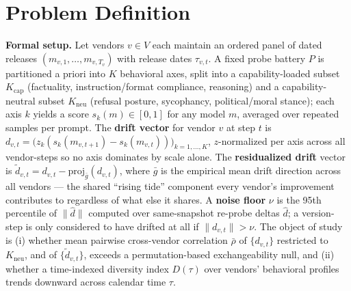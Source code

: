 \documentclass[11pt]{article}
\begin{document}
\section{Problem Definition}

\noindent\textbf{Formal setup.} Let vendors $v \in V$ each maintain an ordered panel of dated releases $(m_{v,1}, \dots, m_{v,T_v})$ with release dates $\tau_{v,t}$. A fixed probe battery $P$ is partitioned a priori into $K$ behavioral axes, split into a capability-loaded subset $K_{\text{cap}}$ (factuality, instruction/format compliance, reasoning) and a capability-neutral subset $K_{\text{neu}}$ (refusal posture, sycophancy, political/moral stance); each axis $k$ yields a score $s_k(m) \in [0,1]$ for any model $m$, averaged over repeated samples per prompt. The \textbf{drift vector} for vendor $v$ at step $t$ is $d_{v,t} = \big( z_k(s_k(m_{v,t+1}) - s_k(m_{v,t})) \big)_{k=1,\dots,K}$, $z$-normalized per axis across all vendor-steps so no axis dominates by scale alone. The \textbf{residualized drift} vector is $\tilde{d}_{v,t} = d_{v,t} - \mathrm{proj}_{\bar{g}}(d_{v,t})$, where $\bar{g}$ is the empirical mean drift direction across all vendors --- the shared ``rising tide'' component every vendor's improvement contributes to regardless of what else it shares. A \textbf{noise floor} $\nu$ is the 95th percentile of $\|\hat{d}\|$ computed over same-snapshot re-probe deltas $\hat{d}$; a version-step is only considered to have drifted at all if $\|d_{v,t}\| > \nu$. The object of study is (i) whether mean pairwise cross-vendor correlation $\bar{\rho}$ of $\{d_{v,t}\}$ restricted to $K_{\text{neu}}$, and of $\{\tilde{d}_{v,t}\}$, exceeds a permutation-based exchangeability null, and (ii) whether a time-indexed diversity index $D(\tau)$ over vendors' behavioral profiles trends downward across calendar time $\tau$.
\end{document}
